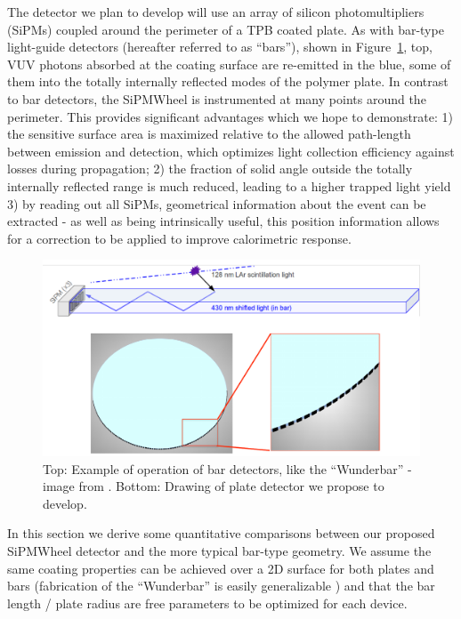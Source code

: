 The detector we plan to develop will use an array of silicon photomultipliers (SiPMs) coupled around the perimeter of a TPB coated plate.  As with bar-type light-guide detectors (hereafter referred to as ``bars''), shown in Figure~\ref{fig:DetectorSketch}, top, VUV photons absorbed at the coating surface are re-emitted in the blue, some of them into the totally internally reflected modes of the polymer plate.  In contrast to bar detectors, the SiPMWheel is instrumented at many points around the perimeter.  This provides significant advantages which we hope to demonstrate: 1) the sensitive surface area is maximized relative to the allowed path-length between emission and detection, which optimizes light collection efficiency against losses during propagation; 2) the fraction of solid angle outside the totally internally reflected range is much reduced, leading to a higher trapped light yield  3) by reading out all SiPMs, geometrical information about the  event can be extracted - as well as being intrinsically useful, this position information allows for a correction to be applied to improve calorimetric response.




\begin{figure}[t]
\begin{centering}
\includegraphics[width=0.75\columnwidth]{./images/SketchOfDetector.pdf}
\par\end{centering}

\caption{Top: Example of operation of bar detectors, like the ``Wunderbar'' - image from \cite{Whittington:2014aha}.  Bottom: Drawing of plate detector we propose to develop. \label{fig:DetectorSketch}}
\end{figure}

In this section we derive some quantitative comparisons between our proposed SiPMWheel detector and the more typical bar-type geometry.  We assume the same coating properties can be achieved over a 2D surface for both plates and bars (fabrication of the ``Wunderbar'' is easily generalizable \cite{Moss:2014ota}) and that the bar length / plate radius are free parameters to be optimized for each device. 

